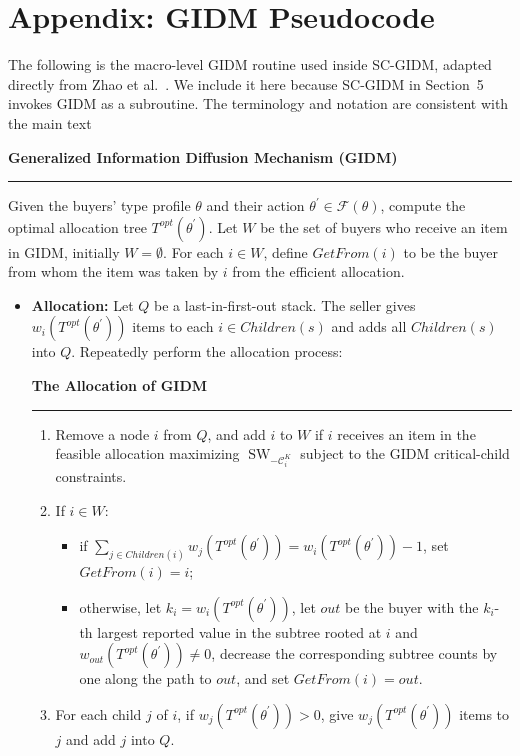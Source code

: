 \documentclass[sigconf]{aamas}
\theoremstyle{definition}
\theoremstyle{remark}
\newcommand{\SW}{\operatorname{SW}}
\begin{document}
\section{Appendix: GIDM Pseudocode}
\label{app:gidm}
The following is the macro-level GIDM routine used inside SC-GIDM, adapted directly from Zhao et al.\ \cite{ZhaoLXHJ18}. We include it here because SC-GIDM in Section~5 invokes GIDM as a subroutine.
The terminology and notation are consistent with the main text
\begin{framed}
\noindent\textbf{Generalized Information Diffusion Mechanism (GIDM)}\\
\rule{\linewidth}{0.5pt}
Given the buyers' type profile $\theta$ and their action $\theta^\prime\in \mathcal{F}(\theta)$, compute the optimal allocation tree $T^{opt}(\theta^\prime)$. Let $W$ be the set of buyers who receive an item in GIDM, initially $W=\emptyset$. For each $i\in W$, define $GetFrom(i)$ to be the buyer from whom the item was taken by $i$ from the efficient allocation.

\begin{itemize}
\item \textbf{Allocation:} Let $Q$ be a last-in-first-out stack. The seller gives $w_i(T^{opt}(\theta^\prime))$ items to each $i\in Children(s)$ and adds all $Children(s)$ into $Q$. Repeatedly perform the allocation process:
\begin{framed}
\noindent\textbf{The Allocation of GIDM}\\
\rule{\linewidth}{0.5pt}
\begin{enumerate}[leftmargin=1.5em]
\item Remove a node $i$ from $Q$, and add $i$ to $W$ if $i$ receives an item in the feasible allocation maximizing $\SW_{-\mathcal{C}_i^{K}}$ subject to the GIDM critical-child constraints.
\item If $i\in W$:
\begin{itemize}
\item if $\sum_{j\in Children(i)} w_j(T^{opt}(\theta^\prime)) = w_i(T^{opt}(\theta^\prime)) - 1$, set $GetFrom(i)=i$;
\item otherwise, let $k_i=w_i(T^{opt}(\theta^\prime))$, let $out$ be the buyer with the $k_i$-th largest reported value in the subtree rooted at $i$ and $w_{out}(T^{opt}(\theta^\prime))\neq 0$, decrease the corresponding subtree counts by one along the path to $out$, and set $GetFrom(i)=out$.
\end{itemize}
\item For each child $j$ of $i$, if $w_j(T^{opt}(\theta^\prime))>0$, give $w_j(T^{opt}(\theta^\prime))$ items to $j$ and add $j$ into $Q$.
\end{enumerate}
\end{framed}


\end{itemize}
\end{framed}
\end{document}
